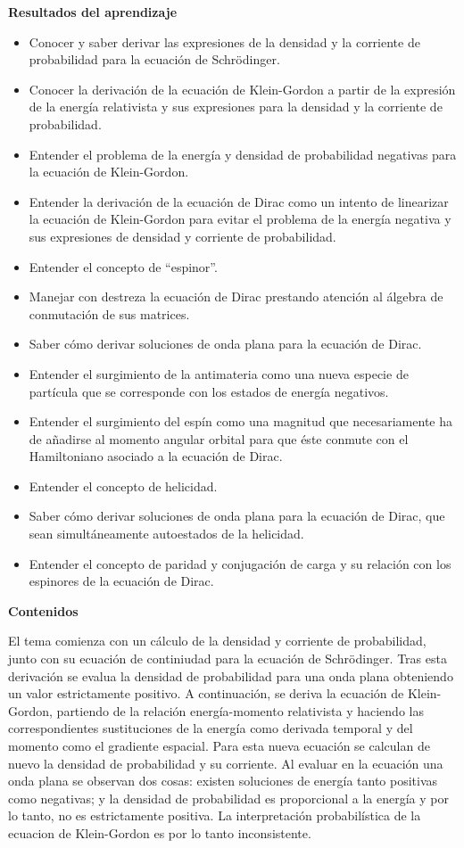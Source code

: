 \textbf{Resultados del aprendizaje}

\begin{itemize}
    \item Conocer y saber derivar las expresiones de la densidad y la corriente de probabilidad para la ecuación de Schrödinger.
    \item Conocer la derivación de la ecuación de Klein-Gordon a partir de la expresión de la energía relativista y sus expresiones para la densidad y la corriente de probabilidad.
    \item Entender el problema de la energía y densidad de probabilidad negativas para la ecuación de Klein-Gordon. 
    \item Entender la derivación de la ecuación de Dirac como un intento de linearizar la ecuación de Klein-Gordon para evitar el problema de la energía negativa y sus expresiones de densidad y corriente de probabilidad.
    \item Entender el concepto de ``espinor''.
    \item Manejar con destreza la ecuación de Dirac prestando atención al álgebra de conmutación de sus matrices.
    \item Saber cómo derivar soluciones de onda plana para la ecuación de Dirac.
    \item Entender el surgimiento de la antimateria como una nueva especie de partícula que se corresponde con los estados de energía negativos.
    \item Entender el surgimiento del espín como una magnitud que necesariamente ha de añadirse al momento angular orbital para que éste conmute con el Hamiltoniano asociado a la ecuación de Dirac.
    \item Entender el concepto de helicidad.
    \item Saber cómo derivar soluciones de onda plana para la ecuación de Dirac, que sean simultáneamente autoestados de la helicidad.
    \item Entender el concepto de paridad y conjugación de carga y su relación con los espinores de la ecuación de Dirac.
\end{itemize}

\textbf{Contenidos}

El tema comienza con un cálculo de la densidad y corriente de probabilidad, junto con su ecuación de continiudad para la ecuación de Schrödinger. Tras esta derivación se evalua la densidad de probabilidad para una onda plana obteniendo un valor estrictamente positivo. A continuación, se deriva la ecuación de Klein-Gordon, partiendo de la relación energía-momento relativista y haciendo las correspondientes sustituciones de la energía como derivada temporal y del momento como el gradiente espacial. Para esta nueva ecuación se calculan de nuevo la densidad de probabilidad y su corriente. Al evaluar en la ecuación una onda plana se observan dos cosas: existen soluciones de energía tanto positivas como negativas; y la densidad de probabilidad es proporcional a la energía y por lo tanto, no es estrictamente positiva. La interpretación probabilística de la ecuacion de Klein-Gordon es por lo tanto inconsistente. 

